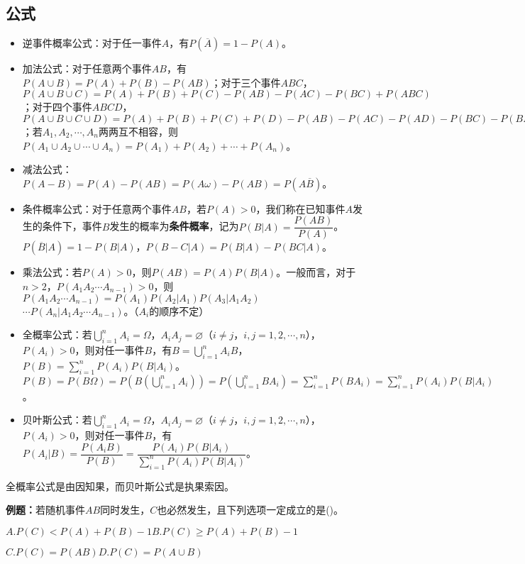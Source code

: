 \subsection{公式}

\begin{itemize}
    \item 逆事件概率公式：对于任一事件$A$，有$P(\overline{A})=1-P(A)$。
    \item 加法公式：对于任意两个事件$AB$，有$P(A\cup B)=P(A)+P(B)-P(AB)$；对于三个事件$ABC$，$P(A\cup B\cup C)=P(A)+P(B)+P(C)-P(AB)-P(AC)-P(BC)+P(ABC)$；对于四个事件$ABCD$，$P(A\cup B\cup C\cup D)=P(A)+P(B)+P(C)+P(D)-P(AB)-P(AC)-P(AD)-P(BC)-P(BD)-P(CD)+P(ABC)+P(ABD)+P(ACD)+P(BCD)-P(ABCD)$；若$A_1,A_2,\cdots,A_n$两两互不相容，则$P(A_1\cup A_2\cup\cdots\cup A_n)=P(A_1)+P(A_2)+\cdots+P(A_n)$。
    \item 减法公式：$P(A-B)=P(A)-P(AB)=P(A\omega)-P(AB)=P(A\overline{B})$。
    \item 条件概率公式：对于任意两个事件$AB$，若$P(A)>0$，我们称在已知事件$A$发生的条件下，事件$B$发生的概率为\textbf{条件概率}，记为$P(B|A)=\dfrac{P(AB)}{P(A)}$。$P(\overline{B}|A)=1-P(B|A)$，$P(B-C|A)=P(B|A)-P(BC|A)$。
    \item 乘法公式：若$P(A)>0$，则$P(AB)=P(A)P(B|A)$。一般而言，对于$n>2$，$P(A_1A_2\cdots A_{n-1})>0$，则$P(A_1A_2\cdots A_{n-1})=P(A_1)P(A_2|A_1)P(A_3|A_1A_2)$\\$\cdots P(A_n|A_1A_2\cdots A_{n-1})$。（$A_i$的顺序不定）
    \item 全概率公式：若$\bigcup\limits_{i=1}^nA_i=\Omega$，$A_iA_j=\varnothing$（$i\neq j$，$i,j=1,2,\cdots,n$），$P(A_i)>0$，则对任一事件$B$，有$B=\bigcup\limits_{i=1}^nA_iB$，$P(B)=\sum\limits_{i=1}^nP(A_i)P(B|A_i)$。$P(B)=P(B\Omega)=P(B(\bigcup\limits_{i=1}^nA_i))=P(\bigcup\limits_{i=1}^nBA_i)=\sum\limits_{i=1}^nP(BA_i)=\sum\limits_{i=1}^nP(A_i)P(B|A_i)$。
    \item 贝叶斯公式：若$\bigcup\limits_{i=1}^nA_i=\Omega$，$A_iA_j=\varnothing$（$i\neq j$，$i,j=1,2,\cdots,n$），$P(A_i)>0$，则对任一事件$B$，有$P(A_i|B)=\dfrac{P(A_iB)}{P(B)}=\dfrac{P(A_i)P(B|A_i)}{\sum\limits_{i=1}^nP(A_i)P(B|A_i)}$。
\end{itemize}

全概率公式是由因知果，而贝叶斯公式是执果索因。

\textbf{例题：}若随机事件$AB$同时发生，$C$也必然发生，且下列选项一定成立的是()。

$A.P(C)<P(A)+P(B)-1$\qquad$B.P(C)\geqslant P(A)+P(B)-1$

$C.P(C)=P(AB)$\qquad$D.P(C)=P(A\cup B)$

